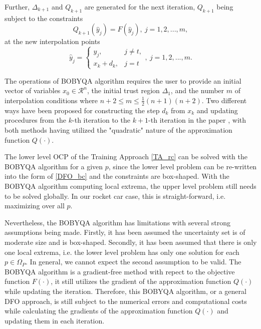 	Further, $\Delta_{k+1}$ and $Q_{k+1}$ are generated for the next iteration, $Q_{k+1}$ being subject to the constraints 
	\begin{equation}
		Q_{k+1}(\hat{y}_j)= F(\hat{y}_j), \  j = 1, 2, ..., m, 
	\end{equation}
	at the new interpolation points
	\begin{equation}
		\hat{y}_j =
		\begin{cases}
			y_j, & j \neq t, \\
			x_k+d_k  , & j =t 
		\end{cases},  \  j = 1, 2, ..., m.
	\end{equation}
	
	The operations of BOBYQA algorithm requires the user to provide an initial vector of variables $x_0 \in \mathcal{R}^n$, the initial trust region $\Delta_1$, and the number $m$ of interpolation conditions where $n+2 \leq m \leq \frac{1}{2}(n+1)(n+2)$. Two different ways have been proposed for constructing the step $d_k$ from $x_k$ and updating procedures from the $k$-th iteration to the $k+1$-th iteration in the paper \cite{MicPow09}, with both methods having utilized the "quadratic" nature of the approximation function $Q(\cdot)$.
	
	The lower level OCP of the Training Approach \ref{TA_rc} can be solved with the BOBYQA algorithm for a given $p$, since the lower level problem can be re-written into the form of \ref{DFO_bc} and the constraints are box-shaped. With the BOBYQA algorithm computing local extrema, the upper level problem still needs to be solved globally. In our rocket car case, this is straight-forward, i.e. maximizing over all $p$. 
	
	Nevertheless, the BOBYQA algorithm has limitations with several strong assumptions being made. Firstly, it has been assumed the uncertainty set is of moderate size and is box-shaped. Secondly, it has been assumed that there is only one local extrema, i.e. the lower level problem has only one solution for each $p \in \Omega_P$. In general, we cannot expect the second assumption to be valid. The BOBYQA algorithm is a gradient-free method with repect to the objective function $F(\cdot)$, it still utilizes the gradient of the approximation function $Q(\cdot)$ while updating the iteration. Therefore, this BOBYQA algorithm, or a general DFO approach, is still subject to the numerical errors and computational costs while calculating the gradients of the approximation function $Q(\cdot)$  and updating them in each iteration.  
	
